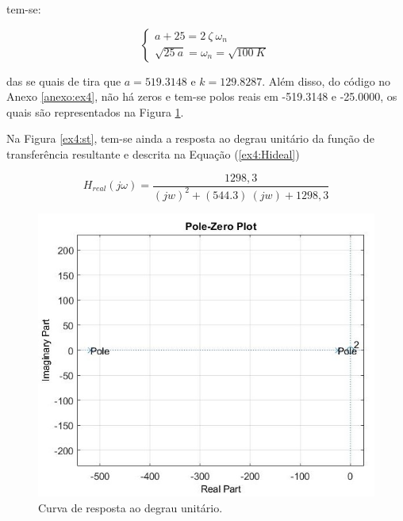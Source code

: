 \documentclass[a4paper,12pt,oneside,openany,table,xcdraw]{article}
\begin{document}
\vspace{0.1cm}
tem-se:

\begin{equation*}
\begin{cases}
a+25=2\ \zeta \ \omega _{n}\\
\sqrt{25\ a} =\omega _{n} =\sqrt{100\ K}
\end{cases}
\end{equation*}
\vspace{0.4cm}

das se quais de tira que $a=519.3148$ e $k=129.8287$. Além disso, do código no Anexo \ref{anexo:ex4}, não há zeros e tem-se polos reais em -519.3148 e
  -25.0000, os quais são representados na Figura \ref{ex4:zp}. 

Na Figura \ref{ex4:st}, tem-se ainda a resposta ao degrau unitário da função de transferência resultante e descrita na Equação (\ref{ex4:Hideal})

\vspace{0.3cm}
\begin{equation} \label{ex4:Hideal}
H_{real}(j\omega) =\dfrac{1298,3}{(jw)^2 + (544.3)\ (jw) + 1298,3}
\end{equation}

\vspace{0.4cm}
\begin{figure}[H]
\centering
\includegraphics[width=13.5cm]{ex4-zp}
\caption{Curva de resposta ao degrau unitário.}
\label{ex4:zp}
\end{figure}
\end{document}
